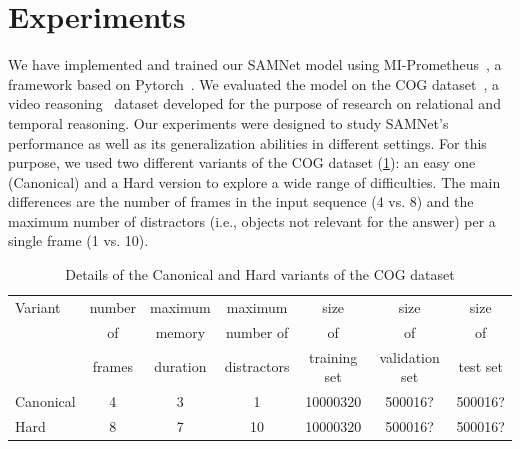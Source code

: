 \section{Experiments}

We have implemented and trained our SAMNet model using MI-Prometheus~\cite{kornuta2018accelerating}, a framework based on Pytorch~\cite{paszke2017automatic}. 
We evaluated the model on the COG dataset~\cite{yang2018dataset}, a video reasoning~\cite{mogadala2019trends} dataset developed for the purpose of research on relational and temporal reasoning.
Our experiments were designed to study SAMNet's performance as well as its generalization abilities in different settings.
For this purpose, we used two different variants of the COG dataset (\cref{tab:cog_variants}): an easy one (Canonical) and a Hard version to explore a wide range of difficulties.
The main differences are the number of frames in the input sequence (4 vs. 8) and the maximum number of distractors (i.e., objects not relevant for the answer) per a single frame (1 vs. 10).


\begin{table}[htb]
\caption{Details of the Canonical and Hard variants of the COG dataset}
\centering
\begin{tabular}{lcccccc}
	\toprule
	Variant    &  	number &  	maximum & maximum & size & size & size  \\ 
	& of   & memory & number of & of & of & of  \\
	& frames & duration & distractors & training set & validation set & test set \\
	\midrule
	Canonical & 4 & 3 & 1 & 10000320 & 500016? & 500016? \\	
	Hard  & 8 & 7 & 10 & 10000320 & 500016?  & 500016? \\
	\bottomrule	
\end{tabular}
\label{tab:cog_variants}
\end{table}




%
%

